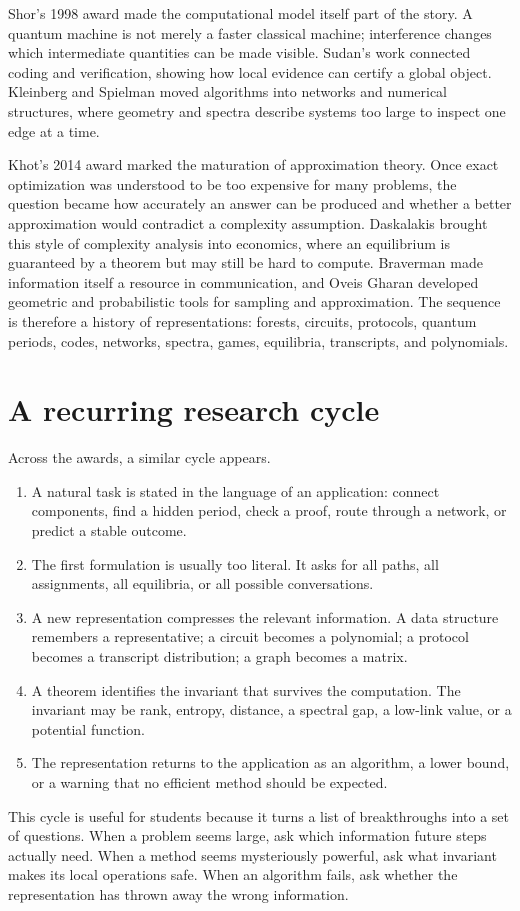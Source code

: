 Shor's 1998 award made the computational model itself part of the story. A quantum machine is not merely a faster classical machine; interference changes which intermediate quantities can be made visible. Sudan's work connected coding and verification, showing how local evidence can certify a global object. Kleinberg and Spielman moved algorithms into networks and numerical structures, where geometry and spectra describe systems too large to inspect one edge at a time.

Khot's 2014 award marked the maturation of approximation theory. Once exact optimization was understood to be too expensive for many problems, the question became how accurately an answer can be produced and whether a better approximation would contradict a complexity assumption. Daskalakis brought this style of complexity analysis into economics, where an equilibrium is guaranteed by a theorem but may still be hard to compute. Braverman made information itself a resource in communication, and Oveis Gharan developed geometric and probabilistic tools for sampling and approximation. The sequence is therefore a history of representations: forests, circuits, protocols, quantum periods, codes, networks, spectra, games, equilibria, transcripts, and polynomials.

\section{A recurring research cycle}
Across the awards, a similar cycle appears.
\begin{enumerate}
\item A natural task is stated in the language of an application: connect components, find a hidden period, check a proof, route through a network, or predict a stable outcome.
\item The first formulation is usually too literal. It asks for all paths, all assignments, all equilibria, or all possible conversations.
\item A new representation compresses the relevant information. A data structure remembers a representative; a circuit becomes a polynomial; a protocol becomes a transcript distribution; a graph becomes a matrix.
\item A theorem identifies the invariant that survives the computation. The invariant may be rank, entropy, distance, a spectral gap, a low-link value, or a potential function.
\item The representation returns to the application as an algorithm, a lower bound, or a warning that no efficient method should be expected.
\end{enumerate}
This cycle is useful for students because it turns a list of breakthroughs into a set of questions. When a problem seems large, ask which information future steps actually need. When a method seems mysteriously powerful, ask what invariant makes its local operations safe. When an algorithm fails, ask whether the representation has thrown away the wrong information.

